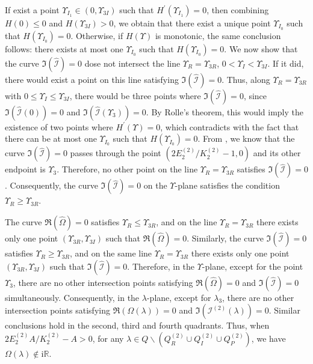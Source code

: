 \documentclass[11pt,reqno]{amsart}
\newcommand{\ii}{\mathrm{i}}
\numberwithin{equation}{section}
\begin{document}
\begin{proof-spec-cn}
	If exist a point $ \Upsilon_{I_1}\in (0,\Upsilon_{3I} )$ such that $H^{\prime}(\Upsilon_{I_1})=0$, then combining $H(0)\le 0$ and $H(\Upsilon_{3I})>0$, we obtain that there exist a unique point $\Upsilon_{I_0}$ such that $H(\Upsilon_{I_0})=0$.
	Otherwise, if $H(\Upsilon)$ is monotonic, the same conclusion follows: there exists at most one $\Upsilon_{I_0}$ such that $H(\Upsilon_{I_0})=0$.
	We now show that the curve $\Im(\hat{\mathcal{I}})=0$ dose not intersect the line $\Upsilon_R=\Upsilon_{3R}$, $0<\Upsilon_I<\Upsilon_{3I}$. 
	If it did, there would exist a point on this line satisfying $\Im(\hat{\mathcal{I}})=0$.
	Thus, along $\Upsilon_R=\Upsilon_{3R}$ with $0\le \Upsilon_I \le \Upsilon_{3I}$, there would be three points where $\Im(\hat{\mathcal{I}})=0$, since $\Im(\hat{\mathcal{I}}(0))=0$ and $\Im(\hat{\mathcal{I}}(\Upsilon_3))=0$.
	By Rolle's theorem, this would imply the existence of two points where $H^{\prime}(\Upsilon)=0$, which contradicts with the fact that there can be at most one $\Upsilon_{I_0}$ such that $H(\Upsilon_{I_0})=0$.
	From , we know that the curve $\Im(\hat{\mathcal{I}})=0$ passes through the point $ (2E^{(2)}_2/K^{(2)}_2-1,0)$ and	its other endpoint is $\Upsilon_3$. 
	Therefore, no other point on the line $\Upsilon_R=\Upsilon_{3R}$ satisfies $\Im(\hat{\mathcal{I}})=0$. 
	Consequently, the curve ${\Im}(\hat{\mathcal{I}})=0$ on the $\Upsilon$-plane satisfies the condition $\Upsilon_R\ge \Upsilon_{3R}$. 
	
	The curve  ${\Re}(\hat{\Omega})=0$ satisfies $\Upsilon_R\le \Upsilon_{3R}$, and on the line $\Upsilon_R=\Upsilon_{3R}$ there exists only one point $(\Upsilon_{3R},\Upsilon_{3I})$ such that ${\Re}(\hat{\Omega})=0$. 
	Similarly, the curve $\Im(\hat{\mathcal{I}})=0$ satisfies $\Upsilon_R\ge \Upsilon_{3R}$, and on the same line $\Upsilon_R=\Upsilon_{3R}$ there exists only one point $(\Upsilon_{3R},\Upsilon_{3I})$ such that ${\Im}(\hat{\mathcal{I}})=0$. 
	Therefore, in the $\Upsilon$-plane, except for the point $\Upsilon_3$, there are no other intersection points satisfying ${\Re}(\hat{\Omega})=0$ and ${\Im}( \hat{\mathcal{I}})=0$ simultaneously. 
	Consequently, in the $\lambda$-plane, except for $\lambda_3$, there are no other intersection points satisfying ${\Re}(\Omega(\lambda))=0$ and ${\Im}( \mathcal{I}^{(2)} (\lambda))=0$. 
	Similar conclusions hold in the second, third and fourth quadrants. 
	Thus, when $2E^{(2)}_2A/K^{(2)}_2-A>0$, for any $\lambda \in Q \backslash (Q^{(2)}_{R}\cup Q^{(2)}_{I}\cup Q^{(2)}_P)$, we have $\Omega(\lambda) \notin \ii  \mathbb{R}$.	
	


\end{proof-spec-cn}
\end{document}
